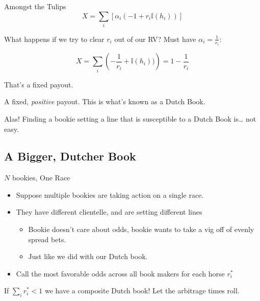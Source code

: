 \documentclass[pdf]{beamer}
\begin{document}
\begin{frame}{Amongst the Tulips}
  \[ X = \sum_i \left[ \alpha_i (-1 + r_i\mathbb{I}(h_i)) \right] \]

  What happens if we try to clear $r_i$ out of our RV? \pause Must have $\alpha_i = \frac{1}{r_i}$:

  \[ X = \sum_i \left( -\frac{1}{r_i} + \mathbb{I}(h_i)) \right) = 1 - \frac{1}{r_i}\]

  \pause

  That's a fixed payout.\\

  \pause

  A fixed, \alert{\emph{positive}} payout. This is what's known as a Dutch Book.
\end{frame}

\begin{frame}{Alas!}
  Finding a bookie setting a line that is susceptible to a Dutch Book is\ldots
  not easy.
\end{frame}

\subsection{A Bigger, Dutcher Book}
\begin{frame}{$N$ bookies, One Race}
  \begin{itemize}
  \item Suppose multiple bookies are taking action on a single race.
  \pause\item They have different clientelle, and are setting different lines
    \begin{itemize}
    \item Bookie doesn't care about odds, bookie wants to take a vig off of evenly spread bets.
    \item Just like we did with our Dutch book.
    \end{itemize}
  \pause\item Call the most favorable odds across all book makers for each horse $r^*_i$
  \end{itemize}
  \pause
  If $ \sum_i r_i^* < 1 $ we have a composite Dutch book! Let the arbitrage
times roll.
\end{frame}
\end{document}
